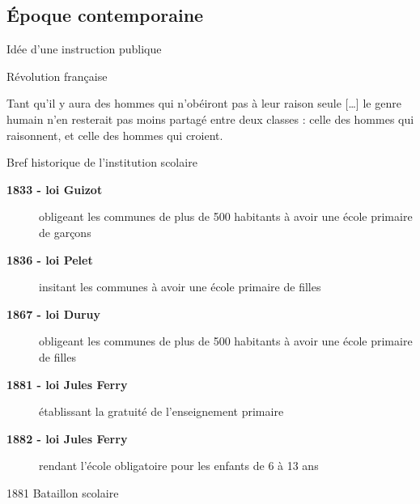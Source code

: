 

\subsection{Époque contemporaine}

\begin{frame}{Idée d'une instruction publique}

Révolution française

\begin{coolquote}
Tant qu'il y aura des hommes qui n'obéiront pas à leur raison seule [\ldots] le genre humain n'en resterait pas moins partagé entre deux classes : celle des hommes qui raisonnent, et celle 
des hommes qui croient.
\end{coolquote}

\end{frame}

\begin{frame}{Bref historique de l'institution scolaire}
\begin{description}
\item[\bf 1833 - loi Guizot] obligeant les communes de plus de 500 habitants à avoir une école primaire de garçons
\item[\bf 1836 - loi Pelet] insitant les communes à avoir une école primaire de filles
\item[\bf 1867 - loi Duruy] obligeant les communes de plus de 500 habitants à avoir une école primaire de filles
\item[\bf 1881 - loi Jules Ferry] établissant la gratuité de l'enseignement primaire
\item[\bf 1882 - loi Jules Ferry] rendant l'école obligatoire pour les enfants de 6 à 13 ans
\end{description}

\end{frame}

\begin{frame}{1881 Bataillon scolaire}
\end{frame}


